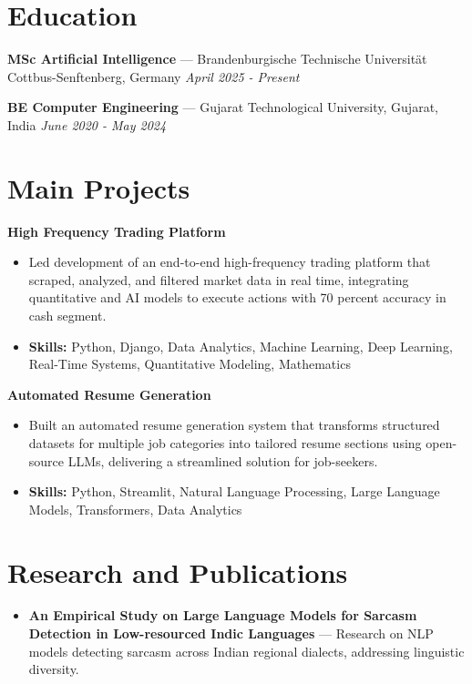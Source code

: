 \documentclass[a4paper,10pt]{article}
\begin{document}
\section*{Education}
\textbf{MSc Artificial Intelligence} — Brandenburgische Technische Universität Cottbus-Senftenberg, Germany \hfill \textit{April 2025 - Present}\par
\vspace{1.5pt}
\textbf{BE Computer Engineering} — Gujarat Technological University, Gujarat, India \hfill \textit{June 2020 - May 2024}\par

\section*{Main Projects}
\textbf{High Frequency Trading Platform}\par
\vspace{1pt}
\begin{itemize}
  \item Led development of an end-to-end high-frequency trading platform that scraped, analyzed, and filtered market data in real time, integrating quantitative and AI models to execute actions with 70 percent accuracy in cash segment.
  \item \textbf{Skills:} Python, Django, Data Analytics, Machine Learning, Deep Learning, Real-Time Systems, Quantitative Modeling, Mathematics
\end{itemize}
\vspace{3pt}
\textbf{Automated Resume Generation}\par
\vspace{1pt}
\begin{itemize}
  \item Built an automated resume generation system that transforms structured datasets for multiple job categories into tailored resume sections using open-source LLMs, delivering a streamlined solution for job-seekers.
  \item \textbf{Skills:} Python, Streamlit, Natural Language Processing, Large Language Models, Transformers, Data Analytics
\end{itemize}

\section*{Research and Publications}
\begin{itemize}
\item \textbf{An Empirical Study on Large Language Models for Sarcasm Detection in Low-resourced Indic Languages} — Research on NLP models detecting sarcasm across Indian regional dialects, addressing linguistic diversity.
\end{itemize}
\end{document}
